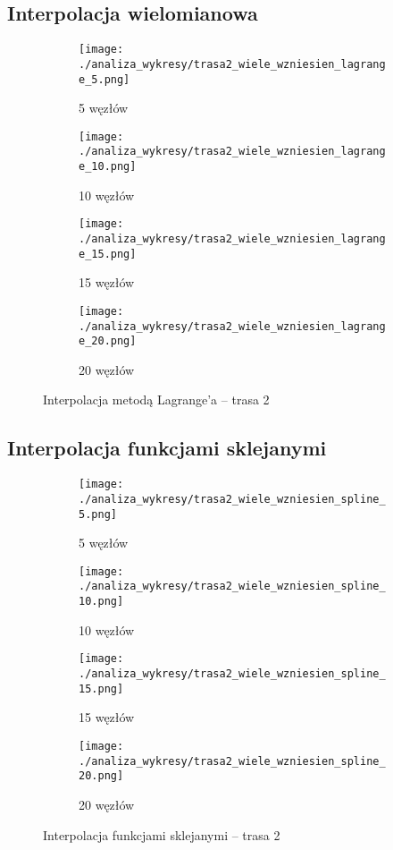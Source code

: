 \documentclass[a4paper,12pt]{article}
\begin{document}
\subsection{Interpolacja wielomianowa}
\begin{figure}[H]
    \centering
    \begin{subfigure}{0.45\textwidth}
        \texttt{[image: ./analiza\_wykresy/trasa2\_wiele\_wzniesien\_lagrange\_5.png]}
        \caption{5 węzłów}
    \end{subfigure}
    \hfill
    \begin{subfigure}{0.45\textwidth}
        \texttt{[image: ./analiza\_wykresy/trasa2\_wiele\_wzniesien\_lagrange\_10.png]}
        \caption{10 węzłów}
    \end{subfigure}

    \vspace{1em}

    \begin{subfigure}{0.45\textwidth}
        \texttt{[image: ./analiza\_wykresy/trasa2\_wiele\_wzniesien\_lagrange\_15.png]}
        \caption{15 węzłów}
    \end{subfigure}
    \hfill
    \begin{subfigure}{0.45\textwidth}
        \texttt{[image: ./analiza\_wykresy/trasa2\_wiele\_wzniesien\_lagrange\_20.png]}
        \caption{20 węzłów}
    \end{subfigure}

    \caption{Interpolacja metodą Lagrange’a – trasa 2}
\end{figure}


\subsection{Interpolacja funkcjami sklejanymi}

\begin{figure}[H]
    \centering
    \begin{subfigure}{0.45\textwidth}
        \texttt{[image: ./analiza\_wykresy/trasa2\_wiele\_wzniesien\_spline\_5.png]}
        \caption{5 węzłów}
    \end{subfigure}
    \hfill
    \begin{subfigure}{0.45\textwidth}
        \texttt{[image: ./analiza\_wykresy/trasa2\_wiele\_wzniesien\_spline\_10.png]}
        \caption{10 węzłów}
    \end{subfigure}

    \vspace{1em}

    \begin{subfigure}{0.45\textwidth}
        \texttt{[image: ./analiza\_wykresy/trasa2\_wiele\_wzniesien\_spline\_15.png]}
        \caption{15 węzłów}
    \end{subfigure}
    \hfill
    \begin{subfigure}{0.45\textwidth}
        \texttt{[image: ./analiza\_wykresy/trasa2\_wiele\_wzniesien\_spline\_20.png]}
        \caption{20 węzłów}
    \end{subfigure}

    \caption{Interpolacja funkcjami sklejanymi – trasa 2}
\end{figure}
\end{document}
